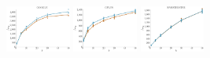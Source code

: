 \documentclass[a4paper]{report}
\newcommand{\wratio}{0.16}
\begin{document}
\vfill
\includegraphics[width=\wratio\textwidth]{maxcut/GOOGLE/fs_google}\hfill
\includegraphics[width=\wratio\textwidth]{maxcut/GPLUS/fs_gplus}\hfill
\includegraphics[width=\wratio\textwidth]{maxcut/HAMSTERSTER/fs_hamsterster}\hfill
\end{document}
